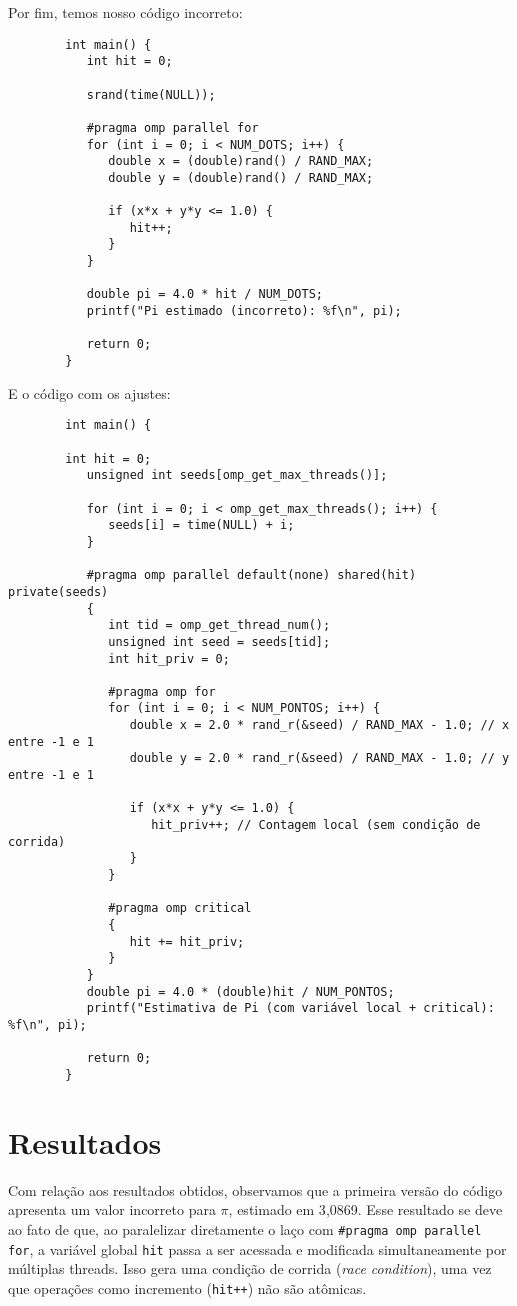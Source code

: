 \documentclass[a4paper, 12pt]{article}
\begin{document}
	Por fim, temos nosso código incorreto: 
	
	\begin{verbatim}
		int main() {
		   int hit = 0;
			
		   srand(time(NULL));
		
		   #pragma omp parallel for
		   for (int i = 0; i < NUM_DOTS; i++) {
		      double x = (double)rand() / RAND_MAX;
		      double y = (double)rand() / RAND_MAX;
				
		      if (x*x + y*y <= 1.0) {
		         hit++;
		      }
		   }
			
		   double pi = 4.0 * hit / NUM_DOTS;
		   printf("Pi estimado (incorreto): %f\n", pi);
			
		   return 0;
		}
	\end{verbatim}
	
	E o código com os ajustes:
	
	\begin{verbatim}
		int main() {
		
		int hit = 0;
		   unsigned int seeds[omp_get_max_threads()];
		
		   for (int i = 0; i < omp_get_max_threads(); i++) {
		      seeds[i] = time(NULL) + i;
		   }
		
		   #pragma omp parallel default(none) shared(hit) private(seeds)
		   {
		      int tid = omp_get_thread_num();
		      unsigned int seed = seeds[tid];
		      int hit_priv = 0;
		
		      #pragma omp for
		      for (int i = 0; i < NUM_PONTOS; i++) {
		         double x = 2.0 * rand_r(&seed) / RAND_MAX - 1.0; // x entre -1 e 1
		         double y = 2.0 * rand_r(&seed) / RAND_MAX - 1.0; // y entre -1 e 1
		
		         if (x*x + y*y <= 1.0) {
		            hit_priv++; // Contagem local (sem condição de corrida)
		         }
		      }
		      
		      #pragma omp critical
		      {
		         hit += hit_priv;
		      }
		   }
		   double pi = 4.0 * (double)hit / NUM_PONTOS;
		   printf("Estimativa de Pi (com variável local + critical): %f\n", pi);
		
		   return 0;
		}
	\end{verbatim}
	
	\section{Resultados}
	\hspace{0.7cm}Com relação aos resultados obtidos, observamos que a primeira versão do código apresenta um valor incorreto para $\pi$, estimado em 3{,}0869. Esse resultado se deve ao fato de que, ao paralelizar diretamente o laço com \texttt{\#pragma omp parallel for}, a variável global \texttt{hit} passa a ser acessada e modificada simultaneamente por múltiplas threads. Isso gera uma condição de corrida (\textit{race condition}), uma vez que operações como incremento (\texttt{hit++}) não são atômicas.
	
\end{document}
